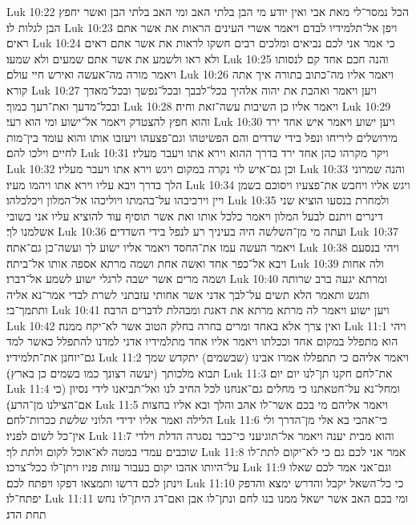 Luk 10:22  הכל נמסר־לי מאת אבי ואין יודע מי הבן בלתי האב ומי האב בלתי הבן ואשר יחפץ הבן לגלות לו׃
Luk 10:23  ויפן אל־תלמידיו לבדם ויאמר אשרי העינים הראות את אשר אתם ראים׃
Luk 10:24  כי אמר אני לכם נביאים ומלכים רבים חשקו לראות את אשר אתם ראים ולא ראו ולשמע את אשר אתם שמעים ולא שמעו׃
Luk 10:25  והנה חכם אחד קם לנסותו ויאמר מורה מה־אעשה ואירש חיי עולם׃
Luk 10:26  ויאמר אליו מה־כתוב בתורה איך אתה קורא׃
Luk 10:27  ויען ויאמר ואהבת את יהוה אלהיך בכל־לבבך ובכל־נפשך ובכל־מאדך ובכל־מדעך ואת־רעך כמוך׃
Luk 10:28  ויאמר אליו כן השיבות עשה־זאת וחיה׃
Luk 10:29  והוא חפץ להצטדק ויאמר אל־ישוע ומי הוא רעי׃
Luk 10:30  ויען ישוע ויאמר איש אחד ירד מירושלים ליריחו ונפל בידי שדדים והם הפשיטהו וגם־פצעהו ויעזבו אותו והוא עומד בין־מות לחיים וילכו להם׃
Luk 10:31  ויקר מקרהו כהן אחד ירד בדרך ההוא וירא אתו ויעבר מעליו׃
Luk 10:32  וכן גם־איש לוי נקרה במקום ויגש וירא אתו ויעבר מעליו׃
Luk 10:33  והנה שמרוני הלך בדרך ויבא עליו וירא אתו ויהמו מעיו׃
Luk 10:34  ויגש אליו ויחבש את־פצעיו ויסוכם בשמן ויין וירכיבהו על־בהמתו ויוליכהו אל־המלון ויכלכלהו׃
Luk 10:35  ולמחרת בנסעו הוציא שני דינרים ויתנם לבעל המלון ויאמר כלכל אותו ואת אשר תוסיף עוד להוציא עליו אני בשובי אשלמנו לך׃
Luk 10:36  ועתה מי מן־השלשה היה בעיניך רע לנפל בידי השדדים׃
Luk 10:37  ויאמר העשה עמו את־החסד ויאמר אליו ישוע לך ועשה־כן גם־אתה׃
Luk 10:38  ויהי בנסעם ויבא אל־כפר אחד ואשה אחת ושמה מרתא אספה אותו אל־ביתה׃
Luk 10:39  ולה אחות ושמה מרים אשר ישבה לרגלי ישוע לשמע אל־דברו׃
Luk 10:40  ומרתא יגעה ברב שרותה ותגש ותאמר הלא תשים על־לבך אדני אשר אחותי עזבתני לשרת לבדי אמר־נא אליה ותתמך־בי׃
Luk 10:41  ויען ישוע ויאמר לה מרתא מרתא את דאגת ומבהלת לדברים הרבה׃
Luk 10:42  ואין צרך אלא באחד ומרים בחרה בחלק הטוב אשר לא־יקח ממנה׃
Luk 11:1  ויהי הוא מתפלל במקום אחד וככלתו ויאמר אליו אחד מתלמידיו אדני למדנו להתפלל כאשר למד גם־יוחנן את־תלמידיו׃
Luk 11:2  ויאמר אליהם כי תתפללו אמרו אבינו (שבשמים) יתקדש שמך תבוא מלכותך (יעשה רצונך כמו בשמים כן בארץ)׃
Luk 11:3  את־לחם חקנו תן־לנו יום יום׃
Luk 11:4  ומחל־נא על־חטאתנו כי מחלים גם־אנחנו לכל החיב לנו ואל־תביאנו לידי נסיון (כי אם־הצילנו מן־הרע)׃
Luk 11:5  ויאמר אליהם מי בכם אשר־לו אהב והלך ובא אליו בחצות הלילה ואמר אליו ידידי הלוני שלשת ככרות־לחם׃
Luk 11:6  כי־אהבי בא אלי מן־הדרך ולי אין־כל לשום לפניו׃
Luk 11:7  והוא מבית יענה ויאמר אל־תוגיעני כי־כבר נסגרה הדלת וילדי שוכבים עמדי במטה לא־אוכל לקום ולתת לך׃
Luk 11:8  אמר אני לכם גם כי לא־יקום לתת־לו על־היותו אהבו יקום בעבור עזות פניו ויתן־לו ככל־צרכו׃
Luk 11:9  וגם־אני אמר לכם שאלו וינתן לכם דרשו ותמצאו דפקו ויפתח לכם׃
Luk 11:10  כי כל־השאל יקבל והדרש ימצא והדפק יפתח־לו׃
Luk 11:11  ומי בכם האב אשר ישאל ממנו בנו לחם ונתן־לו אבן ואם־דג היתן־לו נחש תחת הדג׃
